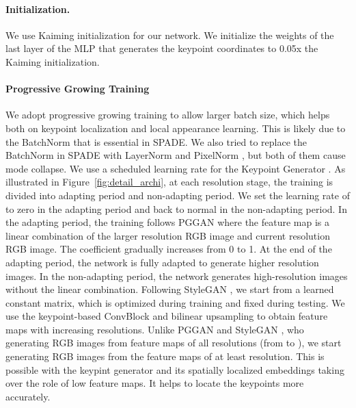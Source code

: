 \documentclass[10pt, conference, compsocconf]{IEEEtran}
\begin{document}
\paragraph{Initialization.} We use Kaiming initialization \cite{he2015delving} for our network. We initialize the weights of the last layer of the MLP that generates the keypoint coordinates to 0.05x the Kaiming initialization.

\paragraph{Progressive Growing Training} We adopt progressive growing training \cite{karras2018progressive} to allow larger batch size, which helps both on keypoint localization and local appearance learning. This is likely due to the BatchNorm that is essential in SPADE. We also tried to replace the BatchNorm in SPADE with LayerNorm \cite{ba2016layer} and PixelNorm \cite{karras2019style}, but both of them cause mode collapse. We use a scheduled learning rate for the Keypoint Generator . As illustrated in Figure~\ref{fig:detail_archi}, at each resolution stage, the training is divided into adapting period and non-adapting period. We set the learning rate of  to zero in the adapting period and back to normal in the non-adapting period. In the adapting period, the training follows PGGAN \cite{karras2018progressive} where the feature map is a linear combination of the larger resolution RGB image and current resolution RGB image. The coefficient  gradually increases from 0 to 1. At the end of the adapting period, the network is fully adapted to generate higher resolution images. In the non-adapting period, the network generates high-resolution images without the linear combination. Following StyleGAN \cite{karras2019style}, we start from a  learned constant matrix, which is optimized during training and fixed during testing. We use the keypoint-based ConvBlock and bilinear upsampling to obtain feature maps with increasing resolutions. Unlike PGGAN \cite{karras2018progressive} and StyleGAN \cite{karras2019style}, who generating RGB images from feature maps of all resolutions (from  to ), we start generating RGB images from the feature maps of at least  resolution. This is possible with the keypint generator and its spatially localized embeddings taking over the role of low feature maps. It helps to locate the keypoints more accurately.
\end{document}
